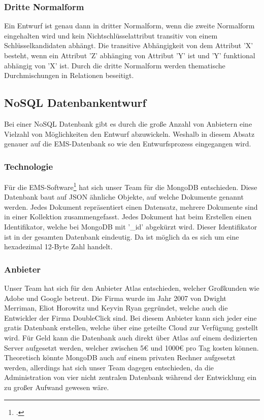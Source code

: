 \subsubsection{Dritte Normalform}
Ein Entwurf ist genau dann in dritter Normalform, wenn die zweite Normalform eingehalten wird und kein Nichtschlüsselattribut transitiv von einem Schlüsselkandidaten abhängt. 
Die transitive Abhängigkeit von dem Attribut 'X' besteht, wenn ein Attribut 'Z' abhänging von Attribut 'Y' ist und 'Y' funktional abhängig von 'X' ist. 
Durch die dritte Normalform werden thematische Durchmischungen in Relationen beseitigt. 		
\subsection{NoSQL Datenbankentwurf}
Bei einer NoSQL Datenbank gibt es durch die große Anzahl von Anbietern eine Vielzahl von Möglichkeiten den Entwurf abzuwickeln. 
Weshalb in diesem Absatz genauer auf die EMS-Datenbank so wie den Entwurfsprozess eingegangen wird. 
\subsubsection{Technologie}
Für die EMS-Software\footcite{mongohistory} hat sich unser Team für die MongoDB entschieden. Diese Datenbank baut auf JSON ähnliche Objekte, auf welche Dokumente genannt werden. 
Jedes Dokument repräsentiert einen Datensatz, mehrere Dokumente sind in einer Kollektion zusammengefasst. 
Jedes Dokument hat beim Erstellen einen Identifikator, welche bei MongoDB mit '\_id' abgekürzt wird. 
Dieser Identifikator ist in der gesamten Datenbank eindeutig. Da ist möglich da es sich um eine hexadezimal 12-Byte Zahl handelt. 
\subsubsection{Anbieter}
Unser Team hat sich für den Anbieter Atlas entschieden, welcher Großkunden wie Adobe und Google betreut. 
Die Firma wurde im Jahr 2007 von Dwight Merriman, Eliot Horowitz und Keyvin Ryan gegründet, welche auch die Entwickler der Firma DoubleClick sind. 
Bei diesem Anbieter kann sich jeder eine gratis Datenbank erstellen, welche über eine geteilte Cloud zur Verfügung gestellt wird. 
Für Geld kann die Datenbank auch direkt über Atlas auf einem dedizierten Server aufgesetzt werden, welcher zwischen 5€ und 1000€ pro Tag kosten können. 
Theoretisch könnte MongoDB auch auf einem privaten Rechner aufgesetzt werden, allerdings hat sich unser Team dagegen entschieden, da die Administration von vier nicht zentralen Datenbank während der Entwicklung ein zu großer Aufwand gewesen wäre.
